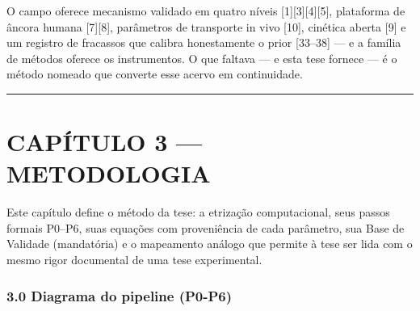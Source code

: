 \documentclass[
  12pt,
]{report}
\begin{document}
O campo oferece mecanismo validado em quatro níveis
{[}1{]}{[}3{]}{[}4{]}{[}5{]}, plataforma de âncora humana
{[}7{]}{[}8{]}, parâmetros de transporte in vivo {[}10{]}, cinética
aberta {[}9{]} e um registro de fracassos que calibra honestamente o
prior {[}33--38{]} --- e a família de métodos oferece os instrumentos. O
que faltava --- e esta tese fornece --- é o método nomeado que converte
esse acervo em continuidade.

\begin{center}\rule{0.5\linewidth}{0.5pt}\end{center}

\hypertarget{capuxedtulo-3-metodologia}{%
\chapter{CAPÍTULO 3 --- METODOLOGIA}\label{capuxedtulo-3-metodologia}}

Este capítulo define o método da tese: a etrização computacional, seus
passos formais P0--P6, suas equações com proveniência de cada parâmetro,
sua Base de Validade (mandatória) e o mapeamento análogo que permite à
tese ser lida com o mesmo rigor documental de uma tese experimental.

\hypertarget{diagrama-do-pipeline-p0-p6}{%
\subsection{3.0 Diagrama do pipeline
(P0-P6)}\label{diagrama-do-pipeline-p0-p6}}
\end{document}
